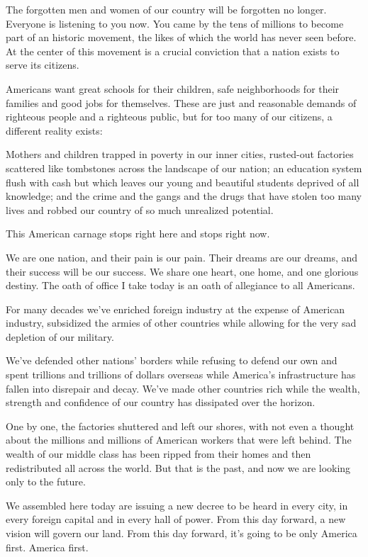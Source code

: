\documentclass[10pt,a4paper]{article}
\begin{document}
The forgotten men and women of our country will be forgotten no longer. Everyone is listening to you now. You came by the tens of millions to become part of an historic movement, the likes of which the world has never seen before. At the center of this movement is a crucial conviction that a nation exists to serve its citizens.

Americans want great schools for their children, safe neighborhoods for their families and good jobs for themselves. These are just and reasonable demands of righteous people and a righteous public, but for too many of our citizens, a different reality exists:

Mothers and children trapped in poverty in our inner cities, rusted-out factories scattered like tombstones across the landscape of our nation; an education system flush with cash but which leaves our young and beautiful students deprived of all knowledge; and the crime and the gangs and the drugs that have stolen too many lives and robbed our country of so much unrealized potential.

This American carnage stops right here and stops right now.

We are one nation, and their pain is our pain. Their dreams are our dreams, and their success will be our success. We share one heart, one home, and one glorious destiny. The oath of office I take today is an oath of allegiance to all Americans.

For many decades we’ve enriched foreign industry at the expense of American industry, subsidized the armies of other countries while allowing for the very sad depletion of our military.

We've defended other nations’ borders while refusing to defend our own and spent trillions and trillions of dollars overseas while America's infrastructure has fallen into disrepair and decay. We've made other countries rich while the wealth, strength and confidence of our country has dissipated over the horizon.

One by one, the factories shuttered and left our shores, with not even a thought about the millions and millions of American workers that were left behind. The wealth of our middle class has been ripped from their homes and then redistributed all across the world. But that is the past, and now we are looking only to the future.

We assembled here today are issuing a new decree to be heard in every city, in every foreign capital and in every hall of power. From this day forward, a new vision will govern our land. From this day forward, it's going to be only America first. America first.
\end{document}
